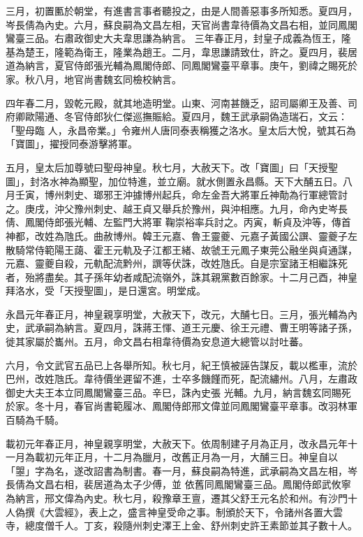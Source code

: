 \begin{pinyinscope}
 三月，初置匭於朝堂，有進書言事者聽投之，由是人間善惡事多所知悉。夏四月，岑長倩為內史。六月，蘇良嗣為文昌左相，天官尚書韋待價為文昌右相，並同鳳閣鸞臺三品。右肅政御史大夫韋思謙為納言。
 三年春正月，封皇子成義為恆王，隆基為楚王，隆範為衛王，隆業為趙王。二月，韋思謙請致仕，許之。夏四月，裴居道為納言，夏官侍郎張光輔為鳳閣侍郎、同鳳閣鸞臺平章事。庚午，劉禕之賜死於家。秋八月，地官尚書魏玄同檢校納言。



 四年春二月，毀乾元殿，就其地造明堂。山東、河南甚饑乏，詔司屬卿王及善、司府卿歐陽通、冬官侍郎狄仁傑巡撫賑給。夏四月，魏王武承嗣偽造瑞石，文云：「聖母臨
 人，永昌帝業。」令雍州人唐同泰表稱獲之洛水。皇太后大悅，號其石為「寶圖」，擢授同泰游擊將軍。



 五月，皇太后加尊號曰聖母神皇。秋七月，大赦天下。改「寶圖」曰「天授聖圖」，封洛水神為顯聖，加位特進，並立廟。就水側置永昌縣。天下大酺五日。八月壬寅，博州刺史、瑯邪王沖據博州起兵，命左金吾大將軍丘神勣為行軍總管討之。庚戌，沖父豫州刺史、越王貞又舉兵於豫州，與沖相應。九月，命內史岑長倩、鳳閣侍郎張光輔、左監門大將軍
 鞠崇裕率兵討之。丙寅，斬貞及沖等，傳首神都，改姓為虺氏。曲赦博州。韓王元嘉、魯王靈夔、元嘉子黃國公譔、靈夔子左散騎常侍範陽王藹、霍王元軌及子江都王緒、故虢王元鳳子東莞公融坐與貞通謀，元嘉、靈夔自殺，元軌配流黔州，譔等伏誅，改姓虺氏。自是宗室諸王相繼誅死者，殆將盡矣。其子孫年幼者咸配流嶺外，誅其親黨數百餘家。十二月己酉，神皇拜洛水，受「天授聖圖」，是日還宮。明堂成。



 永昌元年春正月，神皇親享明堂，大赦天下，改元，大酺七日。三月，張光輔為內史，武承嗣為納言。夏四月，誅蔣王惲、道王元慶、徐王元禮、曹王明等諸子孫，徙其家屬於巂州。五月，命文昌右相韋待價為安息道大總管以討吐蕃。



 六月，令文武官五品已上各舉所知。秋七月，紀王慎被誣告謀反，載以檻車，流於巴州，改姓虺氏。韋待價坐遲留不進，士卒多饑饉而死，配流繡州。八月，左肅政御史大夫王本立同鳳閣鸞臺三品。辛巳，誅內史張
 光輔。九月，納言魏玄同賜死於家。冬十月，春官尚書範履冰、鳳閣侍郎邢文偉並同鳳閣鸞臺平章事。改羽林軍百騎為千騎。



 載初元年春正月，神皇親享明堂，大赦天下。依周制建子月為正月，改永昌元年十一月為載初元年正月，十二月為臘月，改舊正月為一月，大酺三日。神皇自以「曌」字為名，遂改詔書為制書。春一月，蘇良嗣為特進，武承嗣為文昌左相，岑長倩為文昌右相，裴居道為太子少傅，並
 依舊同鳳閣鸞臺三品。鳳閣侍郎武攸寧為納言，邢文偉為內史。秋七月，殺豫章王亶，遷其父舒王元名於和州。有沙門十人偽撰《大雲經》，表上之，盛言神皇受命之事。制頒於天下，令諸州各置大雲寺，總度僧千人。丁亥，殺隨州刺史澤王上金、舒州刺史許王素節並其子數十人。




\end{pinyinscope}
